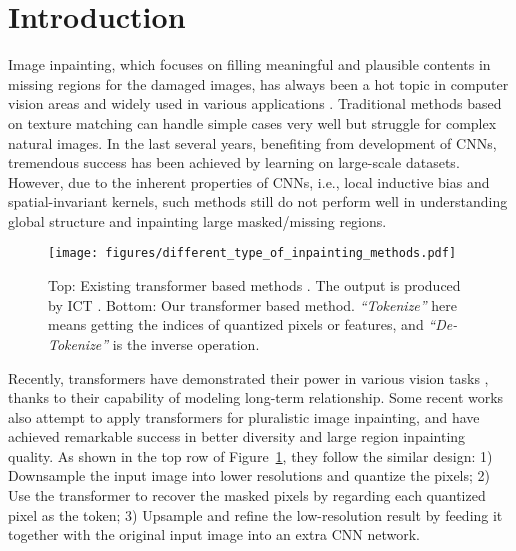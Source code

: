 \documentclass[10pt,twocolumn,letterpaper]{article}
\newcommand{\Fref}[1]{Figure~\ref{#1}}
\begin{document}
\section{Introduction}
\label{sec:intro}
    Image inpainting, which focuses on filling meaningful and plausible contents in missing regions for the damaged images, has always been a hot topic in computer vision areas and widely used in various applications \cite{sun2018moire, qiu2020semanticadv, zhan2020self, barnes2009patchmatch,wan2020bringing,wan2022old,tan2020michigan}. Traditional methods \cite{bertalmio2003simultaneous, barnes2009patchmatch, criminisi2004region} based on texture matching can handle simple cases very well but struggle for complex natural images. In the last several years, benefiting from development of CNNs, tremendous success \cite{pathak2016context,liu2018image,liu2019coherent,yu2018generative} has been achieved by learning on large-scale datasets. However, due to the inherent properties of CNNs, i.e., local inductive bias and spatial-invariant kernels, such methods still do not perform  well in understanding global structure and inpainting large masked/missing regions. 
   
	\begin{figure}[t]
		\centering
		\texttt{[image: figures/different\_type\_of\_inpainting\_methods.pdf]} 
		\caption{Top: Existing transformer based methods \cite{wan2021high}.
		The output is produced by ICT \cite{wan2021high}. 
		Bottom: Our transformer based method. 
		\emph{``Tokenize''} here means getting the indices of quantized pixels or features, and \emph{``De-Tokenize''} is the inverse operation.
		}
		\vspace{-8pt}
		\label{figure: different_type_of_methods}
	\end{figure}
    
    
    
    Recently, transformers have demonstrated their power in various vision tasks \cite{carion2020end,dong2021cswin,chen2022mobile,chen2021pix2seq, chen2020generative, esser2021taming, ramesh2021zero, chen2021transformer, wang2021transformer}, thanks to their capability of modeling long-term relationship. Some recent works \cite{wan2021high} also attempt to apply transformers for pluralistic image inpainting, and have achieved remarkable success in better diversity and large region inpainting quality. As shown in the top row of \Fref{figure: different_type_of_methods}, they follow the similar design: 1) Downsample the input image into lower resolutions and quantize the pixels; 2) Use the transformer to recover the masked pixels by regarding each quantized pixel as the token; 3) Upsample and refine the low-resolution result by feeding it together with the original input image into an extra CNN network. 
    
\end{document}
